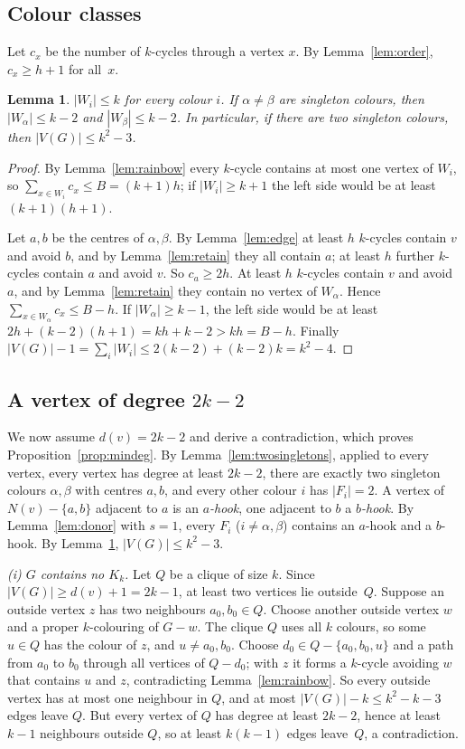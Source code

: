 \documentclass[11pt]{article}
\newtheorem{lemma}{Lemma}
\theoremstyle{remark}
\begin{document}
\subsection{Colour classes}

Let $c_x$ be the number of $k$-cycles through a vertex $x$. By
Lemma~\ref{lem:order}, $c_x\ge h+1$ for all~$x$.

\begin{lemma}\label{lem:classes}
$|W_i|\le k$ for every colour $i$. If $\alpha\ne\beta$ are singleton colours,
then $|W_\alpha|\le k-2$ and $|W_\beta|\le k-2$. In particular, if there are two
singleton colours, then $|V(G)|\le k^2-3$.
\end{lemma}

\begin{proof}
By Lemma~\ref{lem:rainbow} every $k$-cycle contains at most one vertex of
$W_i$, so $\sum_{x\in W_i}c_x\le B=(k+1)h$; if $|W_i|\ge k+1$ the left side
would be at least $(k+1)(h+1)$.

Let $a,b$ be the centres of $\alpha,\beta$. By Lemma~\ref{lem:edge} at least
$h$ $k$-cycles contain $v$ and avoid $b$, and by Lemma~\ref{lem:retain} they
all contain $a$; at least $h$ further $k$-cycles contain $a$ and avoid $v$. So
$c_a\ge2h$. At least $h$ $k$-cycles contain $v$ and avoid $a$, and by
Lemma~\ref{lem:retain} they contain no vertex of $W_\alpha$. Hence
$\sum_{x\in W_\alpha}c_x\le B-h$. If $|W_\alpha|\ge k-1$, the left side would
be at least $2h+(k-2)(h+1)=kh+k-2>kh=B-h$. Finally
$|V(G)|-1=\sum_i|W_i|\le 2(k-2)+(k-2)k=k^2-4$.
\end{proof}

\subsection{A vertex of degree $2k-2$}

We now assume $d(v)=2k-2$ and derive a contradiction, which proves
Proposition~\ref{prop:mindeg}. By Lemma~\ref{lem:twosingletons}, applied to
every vertex, every vertex has degree at least $2k-2$, there are exactly two singleton colours $\alpha,\beta$
with centres $a,b$, and every other colour $i$ has $|F_i|=2$. A vertex of
$N(v)-\{a,b\}$ adjacent to $a$ is an \emph{$a$-hook}, one adjacent to $b$ a
\emph{$b$-hook}. By Lemma~\ref{lem:donor} with $s=1$, every $F_i$
($i\ne\alpha,\beta$) contains an $a$-hook and a $b$-hook. By
Lemma~\ref{lem:classes}, $|V(G)|\le k^2-3$.

\emph{(i) $G$ contains no $K_k$.} Let $Q$ be a clique of size $k$. Since
$|V(G)|\ge d(v)+1=2k-1$, at least two vertices lie outside~$Q$. Suppose an
outside vertex $z$ has two neighbours $a_0,b_0\in Q$. Choose another outside
vertex $w$ and a proper $k$-colouring of $G-w$. The clique $Q$ uses all $k$
colours, so some $u\in Q$ has the colour of $z$, and $u\ne a_0,b_0$. Choose
$d_0\in Q-\{a_0,b_0,u\}$ and a path from $a_0$ to $b_0$ through all vertices of
$Q-d_0$; with $z$ it forms a $k$-cycle avoiding $w$ that contains $u$ and $z$,
contradicting Lemma~\ref{lem:rainbow}. So every outside vertex has at most one
neighbour in $Q$, and at most $|V(G)|-k\le k^2-k-3$ edges leave $Q$. But every
vertex of $Q$ has degree at least $2k-2$, hence at least $k-1$ neighbours
outside $Q$, so at least $k(k-1)$ edges leave~$Q$, a contradiction.
\end{document}
